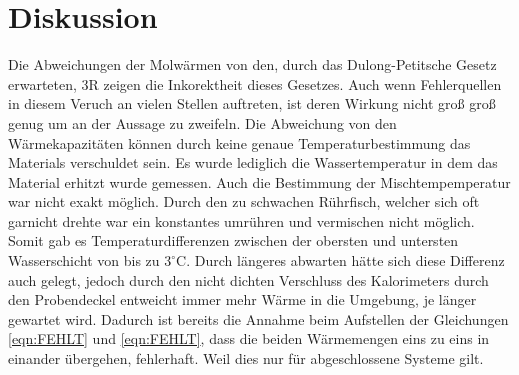 \section{Diskussion}
\label{sec:Diskussion}
Die Abweichungen der Molwärmen von den, durch das Dulong-Petitsche Gesetz erwarteten, 3R zeigen die Inkorektheit dieses Gesetzes.
Auch wenn Fehlerquellen in diesem Veruch an vielen Stellen auftreten, ist deren Wirkung nicht groß groß genug um an der Aussage zu zweifeln.
Die Abweichung von den Wärmekapazitäten können durch keine genaue Temperaturbestimmung das Materials verschuldet sein.
Es wurde lediglich die Wassertemperatur in dem das Material erhitzt wurde gemessen.
Auch die Bestimmung der Mischtempemperatur war nicht exakt möglich.
Durch den zu schwachen Rührfisch, welcher sich oft garnicht drehte war ein konstantes umrühren und vermischen nicht möglich. 
Somit gab es Temperaturdifferenzen zwischen der obersten und untersten Wasserschicht von bis zu $3^\circ$C.
Durch längeres abwarten hätte sich diese Differenz auch gelegt, jedoch durch den nicht dichten Verschluss des Kalorimeters durch den Probendeckel entweicht immer mehr Wärme in die Umgebung, je länger gewartet wird.
Dadurch ist bereits die Annahme beim Aufstellen der Gleichungen \ref{eqn:FEHLT} und \ref{eqn:FEHLT}, dass die beiden Wärmemengen eins zu eins in einander übergehen, fehlerhaft.
Weil dies nur für abgeschlossene Systeme gilt.